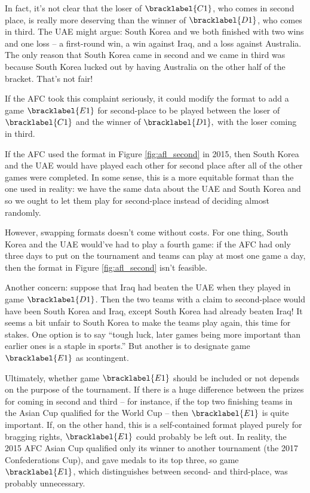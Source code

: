 {    In fact, it's not clear that the loser of $\bracklabel{C1}$, who comes in second place, is really more deserving than the winner of $\bracklabel{D1}$, who comes in third. The UAE might argue: South Korea and we both finished with two wins and one loss -- a first-round win, a win against Iraq, and a loss against Australia. The only reason that South Korea came in second and we came in third was because South Korea lucked out by having Australia on the other half of the bracket. That's not fair!

    If the AFC took this complaint seriously, it could modify the format to add a game $\bracklabel{E1}$ for second-place to be played between the loser of $\bracklabel{C1}$ and the winner of $\bracklabel{D1},$ with the loser coming in third.


    If the AFC used the format in Figure \ref{fig:afl_second} in 2015, then South Korea and the UAE would have played each other for second place after all of the other games were completed. In some sense, this is a more equitable format than the one used in reality: we have the same data about the UAE and South Korea and so we ought to let them play for second-place instead of deciding almost randomly.

    However, swapping formats doesn't come without costs. For one thing, South Korea and the UAE would've had to play a fourth game: if the AFC had only three days to put on the tournament and teams can play at most one game a day, then the format in Figure \ref{fig:afl_second} isn't feasible.

    Another concern: suppose that Iraq had beaten the UAE when they played in game $\bracklabel{D1}$. Then the two teams with a claim to second-place would have been South Korea and Iraq, except South Korea had already beaten Iraq! It seems a bit unfair to South Korea to make the teams play again, this time for stakes. One option is to say ``tough luck, later games being more important than earlier ones is a staple in sports.'' But another is to designate game $\bracklabel{E1}$ as \i{contingent}.


    Ultimately, whether game $\bracklabel{E1}$ should be included or not depends on the purpose of the tournament. If there is a huge difference between the prizes for coming in second and third -- for instance, if the top two finishing teams in the Asian Cup qualified for the World Cup -- then $\bracklabel{E1}$ is quite important. If, on the other hand, this is a self-contained format played purely for bragging rights, $\bracklabel{E1}$ could probably be left out. In reality, the 2015 AFC Asian Cup qualified only its winner to another tournament (the 2017 Confederations Cup), and gave medals to its top three, so game $\bracklabel{E1}$, which distinguishes between second- and third-place, was probably unnecessary.

}
